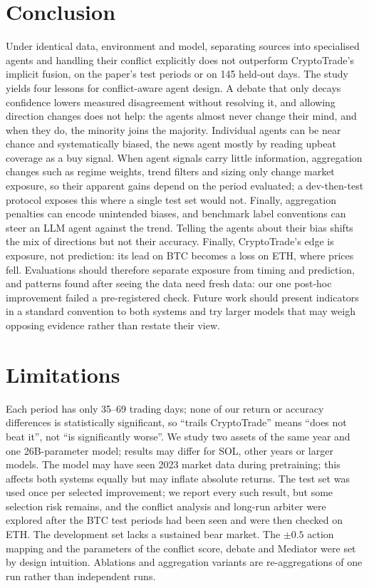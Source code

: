 \documentclass[11pt]{article}
\begin{document}
\section{Conclusion}
Under identical data, environment and model, separating sources into specialised agents and handling their conflict
explicitly does not outperform CryptoTrade's implicit fusion, on the paper's test periods or on 145 held-out days. The
study yields four lessons for conflict-aware agent design. A debate that only decays confidence lowers measured
disagreement without resolving it, and allowing direction changes does not help: the agents almost never change their
mind, and when they do, the minority joins the majority. Individual agents can be near chance and systematically biased, the news agent
mostly by reading upbeat coverage as a buy signal. When agent signals carry little information, aggregation changes such
as regime weights, trend filters and sizing only change market exposure, so their apparent gains depend on the period
evaluated; a dev-then-test protocol exposes this where a single test set would not. Finally, aggregation penalties can
encode unintended biases, and benchmark label conventions can steer an LLM agent against the trend. Telling the agents
about their bias shifts the mix of directions but not their accuracy. Finally, CryptoTrade's edge is exposure, not
prediction: its lead on BTC becomes a loss on ETH, where prices fell. Evaluations should therefore separate exposure from
timing and prediction, and patterns found after seeing the data need fresh data: our one post-hoc improvement failed a
pre-registered check. Future work should present indicators in a standard convention to both systems and try larger
models that may weigh opposing evidence rather than restate their view.

\section*{Limitations}
Each period has only 35--69 trading days; none of our return or accuracy differences is statistically significant,
so ``trails CryptoTrade'' means ``does not beat it'', not ``is significantly worse''. We study
two assets of the same year and one 26B-parameter model; results may differ for SOL, other years or larger models. The model may have seen 2023
market data during pretraining; this affects both systems equally but may inflate absolute returns. The test set was
used once per selected improvement; we report every such result, but some selection risk remains, and the conflict
analysis and long-run arbiter were explored after the BTC test periods had been seen and were then checked on ETH. The development set
lacks a sustained bear market. The $\pm0.5$ action mapping and the parameters of the conflict score, debate and
Mediator were set by design intuition. Ablations and aggregation variants are re-aggregations of one run rather than
independent runs.
\end{document}
